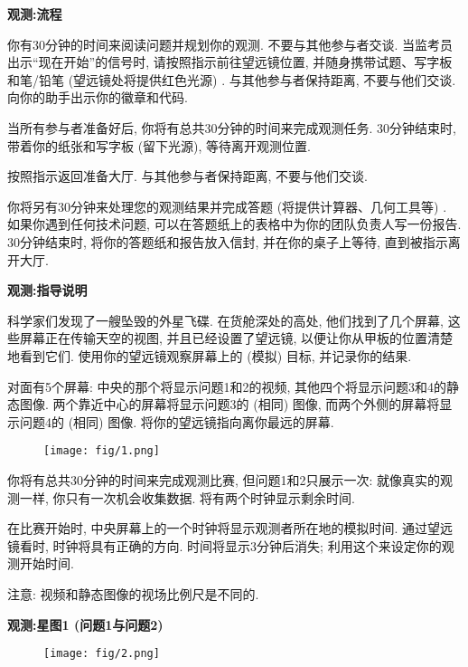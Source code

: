 \documentclass[a4paper,fontset=fandol]{ctexart}
\begin{document}
	{
		\Large\bfseries\noindent 观测:\hspace{0.5em}流程
	}
	
	你有30分钟的时间来阅读问题并规划你的观测. 不要与其他参与者交谈. 当监考员出示``现在开始''的信号时, 请按照指示前往望远镜位置, 并随身携带试题、写字板和笔/铅笔 (望远镜处将提供红色光源) . 与其他参与者保持距离, 不要与他们交谈. 向你的助手出示你的徽章和代码. 
	
	当所有参与者准备好后, 你将有总共30分钟的时间来完成观测任务. 30分钟结束时, 带着你的纸张和写字板 (留下光源), 等待离开观测位置. 
	
	按照指示返回准备大厅. 与其他参与者保持距离, 不要与他们交谈. 
	
	你将另有30分钟来处理您的观测结果并完成答题 (将提供计算器、几何工具等) . 如果你遇到任何技术问题, 可以在答题纸上的表格中为你的团队负责人写一份报告. 30分钟结束时, 将你的答题纸和报告放入信封, 并在你的桌子上等待, 直到被指示离开大厅. 
	
	\vspace{5em}
	{
		\Large\bfseries\noindent 观测:\hspace{0.5em}指导说明
	}
	
	科学家们发现了一艘坠毁的外星飞碟. 在货舱深处的高处, 他们找到了几个屏幕, 这些屏幕正在传输天空的视图, 并且已经设置了望远镜, 以便让你从甲板的位置清楚地看到它们. 使用你的望远镜观察屏幕上的 (模拟) 目标, 并记录你的结果. 
	
	对面有5个屏幕: 中央的那个将显示问题1和2的视频, 其他四个将显示问题3和4的静态图像. 两个靠近中心的屏幕将显示问题3的 (相同) 图像, 而两个外侧的屏幕将显示问题4的 (相同) 图像. 将你的望远镜指向离你最远的屏幕. 
	
	\begin{figure}[!h]
		\centering
		\texttt{[image: fig/1.png]}
	\end{figure}
	
	你将有总共30分钟的时间来完成观测比赛, 但问题1和2只展示一次: 就像真实的观测一样, 你只有一次机会收集数据. 将有两个时钟显示剩余时间. 
	
	在比赛开始时, 中央屏幕上的一个时钟将显示观测者所在地的模拟时间. 通过望远镜看时, 时钟将具有正确的方向. 时间将显示3分钟后消失; 利用这个来设定你的观测开始时间. 
	
	注意: 视频和静态图像的视场比例尺是不同的. 
	
	\newpage
	{
		\Large\bfseries\noindent 观测:\hspace{0.5em}星图1 (问题1与问题2)
	}
	
	\begin{figure}[!h]
		\centering
		\texttt{[image: fig/2.png]}
	\end{figure}
	
\end{document}
